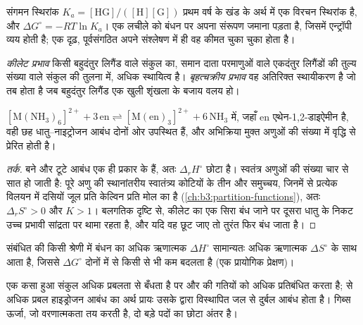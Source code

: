 संगमन स्थिरांक $K_a = [\mathrm{HG}]/([\mathrm H][\mathrm G])$ प्रथम वर्ष के खंड के अर्थ में एक विरचन स्थिरांक है,
और $\Delta G^\circ = -RT\ln K_a$। एक लचीले  को बंधन पर अपना
संरूपण जमाना पड़ता है, जिसमें एन्ट्रॉपी व्यय होती है; एक दृढ़, पूर्वसंगठित 
अपने संश्लेषण में ही वह कीमत चुका चुका होता है।

\begin{definition}[कीलेट और बृहत्चक्रीय प्रभाव]\label{def:b3:supramolecular:macrocyclic}
\emph{कीलेट प्रभाव} किसी बहुदंतुर लिगैंड वाले संकुल का,
समान दाता परमाणुओं वाले एकदंतुर लिगैंडों की तुल्य संख्या वाले संकुल की तुलना में,
अधिक स्थायित्व है। \emph{बृहत्चक्रीय
प्रभाव} वह अतिरिक्त स्थायीकरण है जो तब होता है जब
बहुदंतुर लिगैंड एक खुली शृंखला के बजाय वलय हो।
\end{definition}

\begin{proposition}[कीलेट प्रभाव मुख्यतः एन्ट्रॉपीय है]\label{prop:b3:supramolecular:chelate-entropy}
$\mathrm{[M(NH_3)_6]^{2+} + 3\,en \rightleftharpoons [M(en)_3]^{2+} + 6\,NH_3}$ में, जहाँ en एथेन-1,2-डाइऐमीन है, वही छह
धातु--नाइट्रोजन आबंध दोनों ओर उपस्थित हैं, और अभिक्रिया
मुक्त अणुओं की संख्या में वृद्धि से प्रेरित होती है।
\end{proposition}

\begin{proof}[तर्क]
बने और टूटे आबंध एक ही प्रकार के हैं, अतः $\Delta_rH^\circ$ छोटा है।
स्वतंत्र अणुओं की संख्या चार से सात हो जाती है: पूरे अणु की स्थानांतरीय स्वातंत्र्य कोटियों के तीन
और समुच्चय, जिनमें से प्रत्येक विलयन में दसियों जूल प्रति केल्विन
प्रति मोल का है (\cref{ch:b3:partition-functions}), अतः $\Delta_rS^\circ > 0$ और $K > 1$।
बलगतिक दृष्टि से, कीलेट का एक सिरा बंध जाने पर दूसरा धातु के निकट
उच्च प्रभावी सांद्रता पर थामा रहता है, और यदि वह छूट जाए तो तुरंत फिर बंध जाता है।
\end{proof}

\begin{proposition}[एन्थैल्पी--एन्ट्रॉपी क्षतिपूर्ति]\label{prop:b3:supramolecular:compensation}
संबंधित  की किसी श्रेणी में बंधन का अधिक ऋणात्मक $\Delta H^\circ$
सामान्यतः अधिक ऋणात्मक $\Delta S^\circ$ के साथ आता है, जिससे $\Delta G^\circ$ दोनों में से किसी से भी कम बदलता है (एक
प्रायोगिक प्रेक्षण)।
\end{proposition}

एक कसा हुआ संकुल अधिक प्रबलता से बँधता है पर  और
 की गतियों को अधिक प्रतिबंधित करता है;  से अधिक प्रबल हाइड्रोजन आबंध का अर्थ प्रायः
उसके द्वारा विस्थापित जल से दुर्बल आबंध होता है। गिब्स ऊर्जा, जो वरणात्मकता तय करती है,
दो बड़े पदों का छोटा अंतर है।

